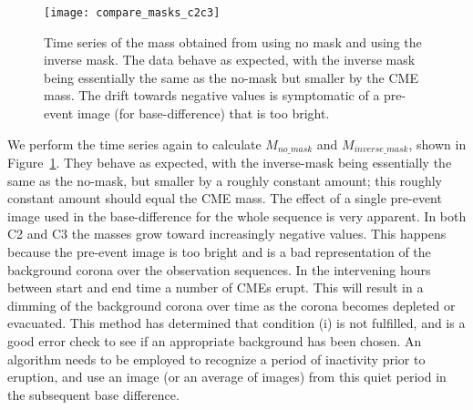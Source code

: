 \begin{figure}[t!]
\begin{center}
\texttt{[image: compare\_masks\_c2c3]}
\caption[Inverse mass time series]{Time series of the mass obtained from using no mask and using the inverse mask. The data behave as expected, with the inverse mask being essentially the same as the no-mask but smaller by the CME mass. The drift towards negative values is symptomatic of a pre-event image (for base-difference) that is too bright.}
\label{fig:comparison0}
\end{center}
\end{figure}
We perform the time series again to calculate $M_{no\_mask}$ and $M_{inverse\_mask}$, shown in Figure~\ref{fig:comparison0}. They behave as expected, with the inverse-mask being essentially the same as the no-mask, but smaller by a roughly constant amount; this roughly constant amount should equal the CME mass. The effect of a single pre-event image used in the base-difference for the whole sequence is very apparent. In both C2 and C3 the masses grow toward increasingly negative values. This happens because the pre-event image is too bright and is a bad representation of the background corona over the observation sequences. In the intervening hours between start and end time a number of CMEs erupt. This will result in a dimming of the background corona over time as the corona becomes depleted or evacuated. This method has determined that condition (i) is not fulfilled, and is a good error check to see if an appropriate background has been chosen. An algorithm needs to be employed to recognize a period of inactivity prior to eruption, and use an image (or an average of images) from this quiet period in the subsequent base difference.


